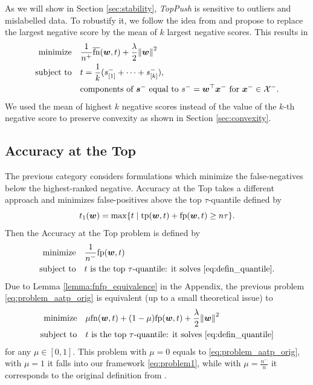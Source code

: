 \documentclass{Thesis}
\newcommand{\Brac}[2][r]{%
  \ifx r#1 \left(       #2 \right)       \else
  \ifx c#1 \left\{      #2 \right\}      \else
  \ifx s#1 \left[       #2 \right]       \else
  \ifx v#1 \left\vert   #2 \right\vert   \else
  \ifx a#1 \left\langle #2 \right\rangle \else
  \ifx t#1 \left\lceil  #2 \right\rceil  \else
  \ifx b#1 \left\lfloor #2 \right\rfloor \else
  \ifx n#1 \left\|      #2 \right\|      \else
  \mathrm{Illegal~option}%
  \fi\fi\fi\fi\fi\fi\fi\fi
}
\newcommand{\Xc}{\mathcal{X}}
\newcommand{\norm}[1]{\Brac[n]{#1}}
\newcommand{\minimize}{\operatorname*{minimize}}
\newcommand{\st}{\operatorname{subject\ to}}
\newcommand{\TopPush}{\emph{TopPush}\xspace}
\newcommand{\tp}{\textnormal{tp}}
\newcommand{\fp}{\textnormal{fp}}
\newcommand{\fn}{\textnormal{fn}}
\newcommand{\fns}{\overline{\textnormal{fn}}}
\begin{document}
As we will show in Section \ref{sec:stability}, \TopPush is sensitive to outliers and mislabelled data. To robustify it, we follow the idea from \cite{lapin.2015} and propose to replace the largest negative score by the mean of $k$ largest negative scores. This results in
\begin{equation}\label{eq:problem_toppushk}
  \begin{aligned}
    \minimize
    & \quad \frac{1}{n^{+}} \fns(\bm{w}, t) + \frac{\lambda}{2} \norm{\bm{w}}^2 \\
    \st
    & \quad t = \frac{1}{k}(s_{[1]}^- + \dots + s_{[k]}^-), \\
    & \quad \text{components of } \bm{s}^- \text{ equal to } s^-= \bm{w}^\top \bm{x}^- \text{ for }\bm{x}^- \in \Xc^-.
  \end{aligned}
\end{equation}
We used the mean of highest $k$ negative scores instead of the value of the $k$-th negative score to preserve convexity as shown in Section \ref{sec:convexity}.

\subsection{Accuracy at the Top}\label{sec:obj2}

The previous category considers formulations which minimize the false-negatives below the highest-ranked negative. Accuracy at the Top \cite{boyd2012accuracy} takes a different approach and minimizes false-positives above the top $\tau$-quantile defined by
\begin{equation}\label{eq:defin_quantile} 
  t_1(\bm{w}) = \max \Brac[c]{t \mid \tp(\bm{w}, t) + \fp(\bm{w}, t) \ge n \tau}.
\end{equation}
Then the Accuracy at the Top problem is defined by
\begin{equation}\label{eq:problem_aatp_orig}
  \begin{aligned}
    \minimize
    & \quad \frac{1}{n^{-}}\fp(\bm{w},t) \\
    \st
    & \quad t \text{ is the top \ensuremath{\tau}-quantile: it solves } \eqref{eq:defin_quantile}.
  \end{aligned}
\end{equation}
Due to Lemma \ref{lemma:fnfp_equivalence} in the Appendix, the previous problem \eqref{eq:problem_aatp_orig} is equivalent (up to a small theoretical issue) to
\begin{equation}\label{eq:problem_aatp}
  \begin{aligned}
    \minimize
    & \quad \mu \fn(\bm{w}, t) + (1 - \mu)\fp(\bm{w}, t) + \frac{\lambda}{2}\norm{\bm{w}}^2\\
    \st
    & \quad t\text{ is the top \ensuremath{\tau}-quantile: it solves }\eqref{eq:defin_quantile}
  \end{aligned}
\end{equation}
for any $\mu \in [0,1]$. This problem with $\mu = 0$ equals to \eqref{eq:problem_aatp_orig}, with $\mu = 1$ it falls into our framework \eqref{eq:problem1}, while with $\mu = \frac{n^-}{n}$ it corresponds to the original definition from \cite{boyd2012accuracy}. 
\end{document}

